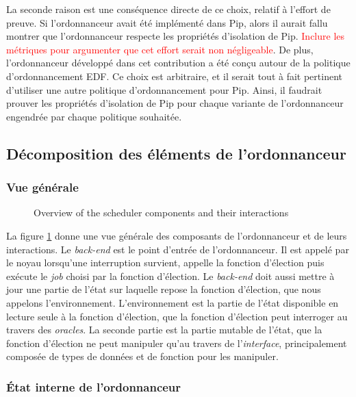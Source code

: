 		La seconde raison est une conséquence directe de ce choix, relatif à l'effort de preuve. Si l'ordonnanceur avait été implémenté dans Pip, alors il aurait fallu montrer que l'ordonnanceur respecte les propriétés d'isolation de Pip. \textcolor{red}{Inclure les métriques pour argumenter que cet effort serait non négligeable}. De plus, l'ordonnanceur développé dans cet contribution a été conçu autour de la politique d'ordonnancement EDF. Ce choix est arbitraire, et il serait tout à fait pertinent d'utiliser une autre politique d'ordonnancement pour Pip. Ainsi, il faudrait prouver les propriétés d'isolation de Pip pour chaque variante de l'ordonnanceur engendrée par chaque politique souhaitée.

		\subsection{Décomposition des éléments de l'ordonnanceur}
			\subsubsection{Vue générale}
			\begin{figure}[!ht]
			    \centering
			    
			    \caption{Overview of the scheduler components and their interactions}
			    \label{fig:project_overview}
			\end{figure}


			La figure \ref{fig:project_overview} donne une vue générale des composants de l'ordonnanceur et de leurs interactions. Le \emph{back-end} est le point d'entrée de l'ordonnanceur. Il est appelé par le noyau lorsqu'une interruption survient, appelle la fonction d'élection puis exécute le \emph{job} choisi par la fonction d'élection. Le \emph{back-end} doit aussi mettre à jour une partie de l'état sur laquelle repose la fonction d'élection, que nous appelons l'environnement. L'environnement est la partie de l'état disponible en lecture seule à la fonction d'élection, que la fonction d'élection peut interroger au travers des \emph{oracles}. La seconde partie est la partie mutable de l'état, que la fonction d'élection ne peut manipuler qu'au travers de l'\emph{interface}, principalement composée de types de données et de fonction pour les manipuler.

		\subsubsection{État interne de l'ordonnanceur}

